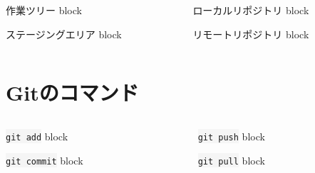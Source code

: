\documentclass[12pt,dvipdfmx,svgnames,uplatex,aspectratio=169]{beamer}
\newcommand{\git}[1]{{\colorbox{WhiteSmoke}{\texttt{#1}}}}  %
\begin{document}
\begin{frame}{\insertsection}
  \begin{columns}[T] %
    \begin{column}{0.5\textwidth}
      \begin{block}{作業ツリー}
        block
      \end{block}
      \begin{block}{ステージングエリア}
        block
      \end{block}
    \end{column}
    \begin{column}{0.5\textwidth}
      \begin{block}{ローカルリポジトリ}
        block
      \end{block}
      \begin{block}{リモートリポジトリ}
        block
      \end{block}
    \end{column}
  \end{columns}
\end{frame}

\section{Gitのコマンド}
\begin{frame}{\insertsection}
  \begin{columns}[T] %
    \begin{column}{0.5\textwidth}
      \begin{block}{\git{git add}}
        block
      \end{block}
      \begin{block}{\git{git commit}}
        block
      \end{block}
    \end{column}
    \begin{column}{0.5\textwidth}
      \begin{block}{\git{git push}}
        block
      \end{block}
      \begin{block}{\git{git pull}}
        block
      \end{block}
    \end{column}
  \end{columns}
\end{frame}
\end{document}
